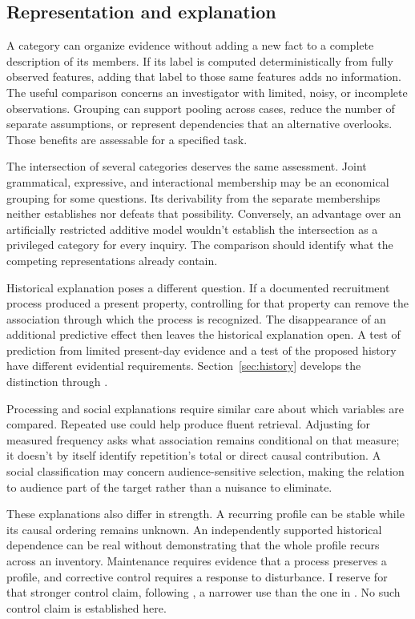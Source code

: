 \documentclass[12pt]{article}
\begin{document}
\subsection{Representation and explanation}

A category can organize evidence without adding a new fact to a complete
description of its members. If its label is computed deterministically from
fully observed features, adding that label to those same features adds no
information. The useful comparison concerns an investigator with limited,
noisy, or incomplete observations. Grouping can support pooling across cases,
reduce the number of separate assumptions, or represent dependencies that
an alternative overlooks. Those benefits are assessable for a specified task.

The intersection of several categories deserves the same assessment.
Joint grammatical, expressive, and interactional membership may be an
economical grouping for some questions. Its derivability from the separate
memberships neither establishes nor defeats that possibility. Conversely,
an advantage over an artificially restricted additive model wouldn't
establish the intersection as a privileged category for every inquiry.
The comparison should identify what the competing representations already
contain.

Historical explanation poses a different question. If a documented
recruitment process produced a present property, controlling for that
property can remove the association through which the process is recognized.
The disappearance of an additional predictive effect then leaves the
historical explanation open. A test of prediction from limited present-day
evidence and a test of the proposed history have different evidential
requirements. Section~\ref{sec:history} develops the distinction through
.

Processing and social explanations require similar care about which
variables are compared. Repeated use could help produce fluent retrieval.
Adjusting for measured frequency asks what association remains conditional
on that measure; it doesn't by itself identify repetition's total or
direct causal contribution. A social classification may concern
audience-sensitive selection, making the relation to audience part of the
target rather than a nuisance to eliminate.

These explanations also differ in strength. A recurring profile can be
stable while its causal ordering remains unknown. An independently
supported historical dependence can be real without demonstrating that
the whole profile recurs across an inventory. Maintenance requires evidence
that a process preserves a profile, and corrective control requires a
response to disturbance. I reserve  for that stronger
control claim, following \textcite{reynolds2026notEveryStableCluster}, a
narrower use than the one in \textcite[143]{boyd1999}. No such control claim is
established here.
\end{document}
